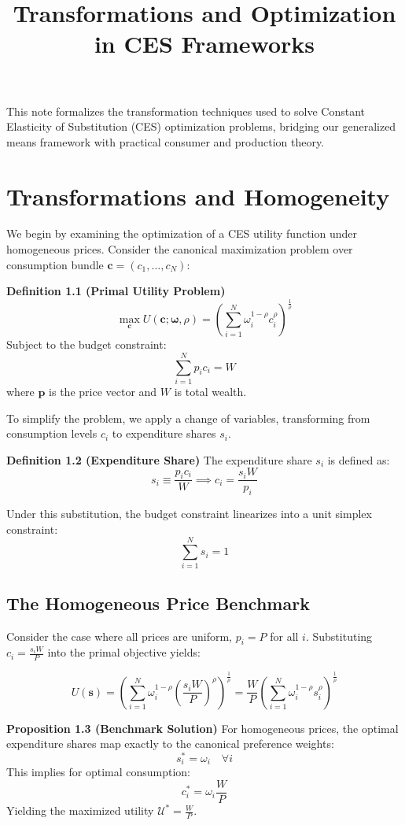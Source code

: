 \documentclass{article}
\title{Transformations and Optimization in CES Frameworks}
\author{}
\date{}
\begin{document}
\maketitle

This note formalizes the transformation techniques used to solve
Constant Elasticity of Substitution (CES) optimization problems,
bridging our generalized means framework with practical consumer and
production theory.

\section{Transformations and Homogeneity}

We begin by examining the optimization of a CES utility function under
homogeneous prices. Consider the canonical maximization problem over
consumption bundle $\boldsymbol{c} = (c_1, \dots, c_N)$:

\textbf{Definition 1.1 (Primal Utility Problem)}
$$ \max_{\boldsymbol{c}} U(\boldsymbol{c}; \boldsymbol{\omega}, \rho) = \left( \sum_{i=1}^N \omega_i^{1-\rho} c_i^\rho \right)^{\frac{1}{\rho}} $$
Subject to the budget constraint: $$ \sum_{i=1}^N p_i c_i = W $$ where
$\boldsymbol{p}$ is the price vector and $W$ is total wealth.

To simplify the problem, we apply a change of variables, transforming
from consumption levels $c_i$ to expenditure shares $s_i$.

\textbf{Definition 1.2 (Expenditure Share)} The expenditure share $s_i$ is
defined as:
$$ s_i \equiv \frac{p_i c_i}{W} \implies c_i = \frac{s_i W}{p_i} $$

Under this substitution, the budget constraint linearizes into a unit
simplex constraint: $$ \sum_{i=1}^N s_i = 1 $$

\subsection{The Homogeneous Price Benchmark}

Consider the case where all prices are uniform, $p_i = P$ for all $i$.
Substituting $c_i = \frac{s_i W}{P}$ into the primal objective yields:

$$ U(\boldsymbol{s}) = \left( \sum_{i=1}^N \omega_i^{1-\rho} \left(\frac{s_i W}{P}\right)^\rho \right)^{\frac{1}{\rho}} = \frac{W}{P} \left( \sum_{i=1}^N \omega_i^{1-\rho} s_i^\rho \right)^{\frac{1}{\rho}} $$

\textbf{Proposition 1.3 (Benchmark Solution)} For homogeneous prices, the
optimal expenditure shares map exactly to the canonical preference
weights: $$ s_i^* = \omega_i \quad \forall i $$ This implies for optimal
consumption: $$ c_i^* = \omega_i \frac{W}{P} $$ Yielding the maximized
utility $\mathcal{U}^* = \frac{W}{P}$.
\end{document}
